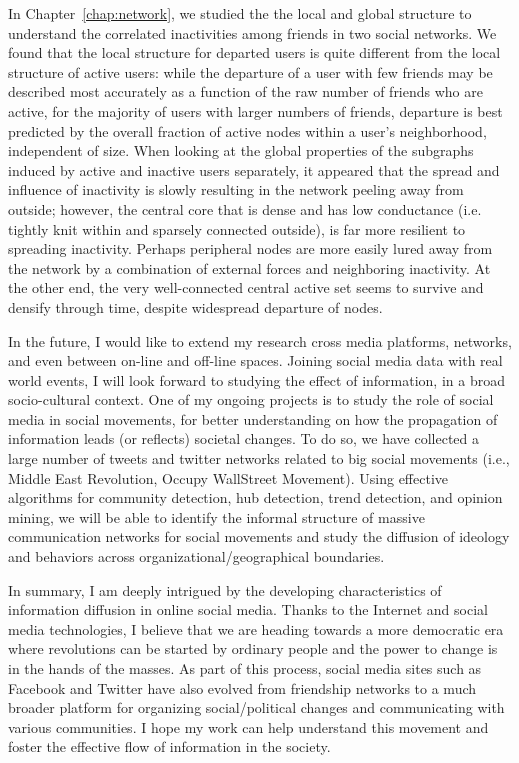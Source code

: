 \documentclass[phd,tocprelim]{cornell}
\begin{document}
In Chapter~\ref{chap:network}, we studied the the local and global structure to understand the correlated inactivities among friends in two social networks. We found that the local structure for departed users is quite different from the local structure of active users: while the departure of a user with few friends may be described most accurately as a function of
the raw number of friends who are active, for the majority of users
with larger numbers of friends, departure is best predicted
by the overall fraction of active nodes within a user's neighborhood,
independent of size.  When looking at the global properties of the subgraphs
induced by active and inactive users separately, it appeared that the spread and influence of inactivity is slowly resulting in
the network peeling away from outside; however, the central core that is dense and has low conductance (i.e. tightly knit within and sparsely connected
outside), is far more resilient to spreading inactivity. Perhaps peripheral nodes are more easily lured away from the network by a
combination of external forces and neighboring inactivity. At the other end, the
very well-connected central active set seems to survive and densify through
time, despite widespread departure of nodes.

In the future, I would like to extend my research cross media platforms, networks, and even between on-line and off-line spaces. Joining social media data with real world events, I will look forward to studying the effect of information, in a broad socio-cultural context. One of my ongoing projects is to study the role of social media in social movements, for better understanding on how the propagation of information leads (or reflects) societal changes. To do so, we have collected a large number of tweets and twitter networks related to big social movements (i.e., Middle East Revolution, Occupy WallStreet Movement). Using effective algorithms for community detection, hub detection, trend detection, and opinion
mining, we will be able to identify the informal structure of massive communication networks
for social movements and study the diffusion of ideology and behaviors across organizational/geographical boundaries.

In summary, I am deeply intrigued by the developing characteristics of information diffusion in online social media. Thanks to the Internet and social media technologies, I believe that we are heading towards a more democratic era where revolutions can be started by ordinary people and the power to change is in the hands of the masses. As part of this process, social media sites such as Facebook and Twitter have also evolved from friendship networks to a much broader platform for organizing social/political changes and communicating with various communities. I hope my work can help understand this movement and foster the effective flow of information in the society.




\end{document}
